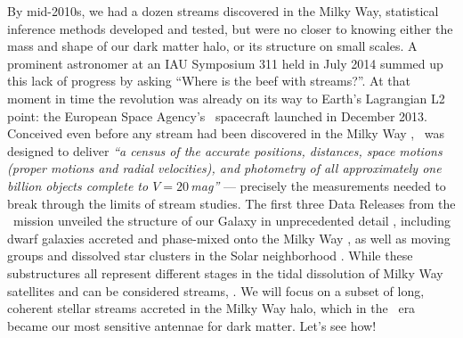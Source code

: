 \documentclass[final,5p,times,twocolumn,authoryear]{elsarticle}
\begin{document}
By  mid-2010s, we had a dozen streams discovered in the Milky Way, statistical inference methods developed and tested, but were no closer to knowing either the mass and shape of our dark matter halo, or its structure on small scales.
A prominent astronomer at an IAU Symposium 311 held in July 2014 summed up this lack of progress by asking ``Where is the beef with streams?''.
At that moment in time the revolution was already on its way to Earth's Lagrangian L2 point: the European Space Agency's \gaia\ spacecraft launched in December 2013.
Conceived even before any stream had been discovered in the Milky Way \citep{lindegren:1993, battrick:1994, lindegren:1996}, \gaia\ was designed to deliver \emph{``a census of the accurate positions, distances, space motions (proper motions and radial velocities), and photometry of all approximately one billion objects complete to $V=20$\,mag''} \citep{perryman:2001} --- precisely the measurements needed to break through the limits of stream studies.
The first three Data Releases from the \gaia\ mission unveiled the structure of our Galaxy in unprecedented detail \citep{babusiaux:2018, helmi:2018, katz:2018, antoja:2021, smart:2021, drimmel:2023, schultheis:2023}, including dwarf galaxies accreted and phase-mixed onto the Milky Way \citep{belokurov:2018, helmi:2018b, myeong:2019, naidu:2020}, as well as moving groups and dissolved star clusters in the Solar neighborhood \citep{antoja:2018, kawata:2018, ramos:2018, meingast:2019, roser:2019, oh:2020}.
While these substructures all represent different stages in the tidal dissolution of Milky Way satellites and can be considered streams, .
We will focus on a subset of long, coherent stellar streams accreted in the Milky Way halo, which in the \gaia\ era became our most sensitive antennae for dark matter.
Let's see how!
\end{document}
